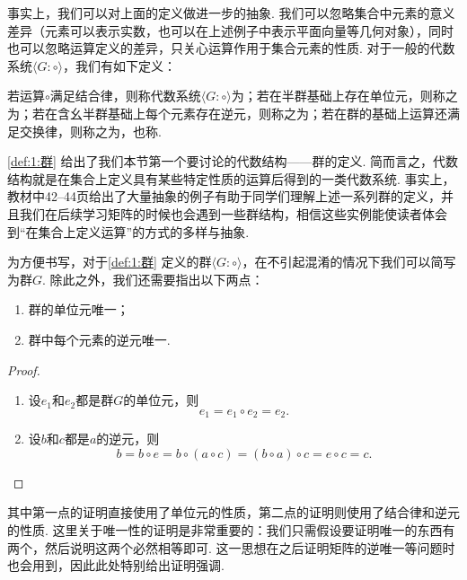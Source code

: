 事实上，我们可以对上面的定义做进一步的抽象. 我们可以忽略集合中元素的意义差异（元素可以表示实数，也可以在上述例子中表示平面向量等几何对象），同时也可以忽略运算定义的差异，只关心运算作用于集合元素的性质. 对于一般的代数系统$\langle G:\circ\rangle$，我们有如下定义：
\begin{definition}[群] \label{def:1:群} 
    若运算$\circ$满足结合律，则称代数系统$\langle G:\circ\rangle$为；若在半群基础上存在单位元，则称之为；若在含幺半群基础上每个元素存在逆元，则称之为；若在群的基础上运算还满足交换律，则称之为，也称.
\end{definition}

\autoref{def:1:群} 给出了我们本节第一个要讨论的代数结构——群的定义. 简而言之，代数结构就是在集合上定义具有某些特定性质的运算后得到的一类代数系统. 事实上，教材中42--44页给出了大量抽象的例子有助于同学们理解上述一系列群的定义，并且我们在后续学习矩阵的时候也会遇到一些群结构，相信这些实例能使读者体会到``在集合上定义运算''的方式的多样与抽象.

为方便书写，对于\autoref{def:1:群} 定义的群$\langle G:\circ\rangle$，在不引起混淆的情况下我们可以简写为群$G$. 除此之外，我们还需要指出以下两点：
\begin{theorem}\label{thm:1:群的单位元逆元唯一}
    \begin{enumerate}
        \item 群的单位元唯一；

        \item 群中每个元素的逆元唯一.
    \end{enumerate}
\end{theorem}

\begin{proof}
    \begin{enumerate}
        \item 设$e_1$和$e_2$都是群$G$的单位元，则
              \[e_1=e_1\circ e_2=e_2.\]

        \item 设$b$和$c$都是$a$的逆元，则
              \[b=b\circ e=b\circ(a\circ c)=(b\circ a)\circ c=e\circ c=c.\]
    \end{enumerate}
\end{proof}

其中第一点的证明直接使用了单位元的性质，第二点的证明则使用了结合律和逆元的性质. 这里关于唯一性的证明是非常重要的：我们只需假设要证明唯一的东西有两个，然后说明这两个必然相等即可. 这一思想在之后证明矩阵的逆唯一等问题时也会用到，因此此处特别给出证明强调.

